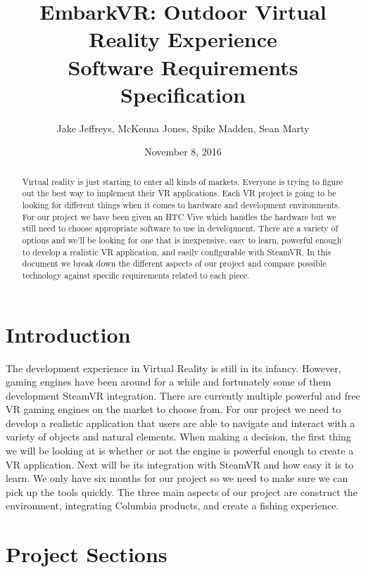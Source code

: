 \documentclass[10pt,journal,compsoc,onecolumn, draftclsnofoot]{IEEEtran}
\title{
EmbarkVR: Outdoor Virtual Reality Experience \\
\vspace{1cm}
Software Requirements Specification \\
\vspace{3cm}
}
\author{Jake Jeffreys, McKenna Jones, Spike Madden, Sean Marty}
\date{November 8, 2016}
\begin{document}
\begin{titlepage}
\vspace{3cm}
\maketitle
\vspace{3cm}
\begin{abstract}
Virtual reality is just starting to enter all kinds of markets. Everyone is trying to figure out the best way to implement their VR applications. Each VR project is going to be looking for different things when it comes to hardware and development environments. For our project we have been given an HTC Vive which handles the hardware but we still need to choose appropriate software to use in development. There are a variety of options and we'll be looking for one that is inexpensive, easy to learn, powerful enough to develop a realistic VR application, and easily configurable with SteamVR. In this document we break down the different aspects of our project and compare possible technology against specific requirements related to each piece.
\end{abstract}

\end{titlepage}

\tableofcontents
\clearpage


\section{Introduction}
The development experience in Virtual Reality is still in its infancy. However, gaming engines have been around for a while and fortunately some of them development SteamVR integration. There are currently multiple powerful and free VR gaming engines on the market to choose from. For our project we need to develop a realistic application that users are able to navigate and interact with a variety of objects and natural elements. When making a decision, the first thing we will be looking at is whether or not the engine is powerful enough to create a VR application. Next will be its integration with SteamVR and how easy it is to learn. We only have six months for our project so we need to make sure we can pick up the tools quickly. The three main aspects of our project are construct the environment, integrating Columbia products, and create a fishing experience.

\section{Project Sections}
\end{document}
